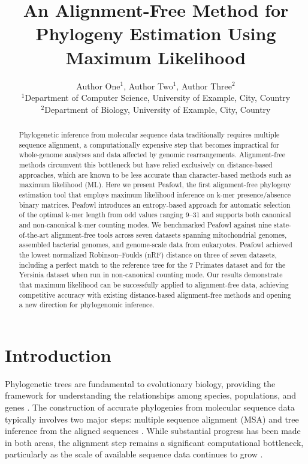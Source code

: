 \documentclass[12pt]{article}
\title{An Alignment-Free Method for Phylogeny Estimation Using Maximum Likelihood}
\author{Author One$^{1}$, Author Two$^{1}$, Author Three$^{2}$ \\
\small $^{1}$Department of Computer Science, University of Example, City, Country \\
\small $^{2}$Department of Biology, University of Example, City, Country}
\date{}
\begin{document}
\maketitle

\begin{abstract}
Phylogenetic inference from molecular sequence data traditionally requires multiple sequence alignment, a computationally expensive step that becomes impractical for whole-genome analyses and data affected by genomic rearrangements. Alignment-free methods circumvent this bottleneck but have relied exclusively on distance-based approaches, which are known to be less accurate than character-based methods such as maximum likelihood (ML). Here we present Peafowl, the first alignment-free phylogeny estimation tool that employs maximum likelihood inference on k-mer presence/absence binary matrices. Peafowl introduces an entropy-based approach for automatic selection of the optimal k-mer length from odd values ranging 9--31 and supports both canonical and non-canonical k-mer counting modes. We benchmarked Peafowl against nine state-of-the-art alignment-free tools across seven datasets spanning mitochondrial genomes, assembled bacterial genomes, and genome-scale data from eukaryotes. Peafowl achieved the lowest normalized Robinson--Foulds (nRF) distance on three of seven datasets, including a perfect match to the reference tree for the 7 Primates dataset and for the Yersinia dataset when run in non-canonical counting mode. Our results demonstrate that maximum likelihood can be successfully applied to alignment-free data, achieving competitive accuracy with existing distance-based alignment-free methods and opening a new direction for phylogenomic inference.
\end{abstract}

\section{Introduction}

Phylogenetic trees are fundamental to evolutionary biology, providing the framework for understanding the relationships among species, populations, and genes \citep{felsenstein2004}. The construction of accurate phylogenies from molecular sequence data typically involves two major steps: multiple sequence alignment (MSA) and tree inference from the aligned sequences \citep{holder2003}. While substantial progress has been made in both areas, the alignment step remains a significant computational bottleneck, particularly as the scale of available sequence data continues to grow \citep{sievers2011}.
\end{document}
